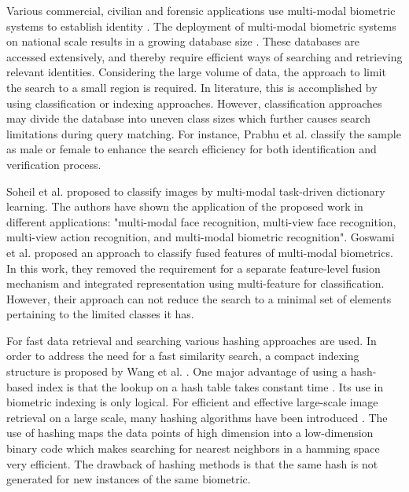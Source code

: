 Various commercial, civilian and forensic applications use multi-modal biometric systems to establish identity \cite{Haghighat2016multi}. 
The deployment of multi-modal biometric systems on national scale results in a growing database
size \cite{Gyaourova2012multi}. 
These databases are accessed extensively, and thereby require efficient ways of
searching and retrieving relevant identities. 
Considering the large volume of data,
the approach to limit the search to a small region is required. In literature, this is
accomplished by using classification or indexing approaches.
However, classification approaches may
divide the database into uneven class sizes which further causes search limitations
during query matching. For instance, Prabhu et al. \cite{Prabhu2015multi} classify the sample as male or
female to enhance the search efficiency for both identification and verification process.

Soheil et al. \cite{Bahrampour2016multi} proposed to classify images by multi-modal task-driven dictionary
learning. The authors have shown the application of the proposed work in different
applications: "multi-modal face recognition, multi-view face recognition, multi-view
action recognition, and multi-modal biometric recognition". 
Goswami et al. \cite{Goswami2016multi}
proposed an approach to classify fused features of multi-modal biometrics. In this
work, they removed the requirement for a separate feature-level fusion mechanism
and integrated representation using multi-feature for classification. However,
their approach can not reduce the search to a minimal set of elements pertaining to the
limited classes it has.

For fast data retrieval and searching various hashing approaches are used.
In order to address the need for a fast similarity search, a compact indexing structure is proposed by Wang et al.
\cite{Wang2012multi}. One major advantage of using a hash-based index is that the lookup on a hash table takes constant time \cite{Wang2016multi}. 
Its use in biometric indexing is only logical. For efficient and effective
large-scale image retrieval on a large scale, many hashing algorithms have been introduced \cite{Kaushik2013multi}. 
The use of hashing maps the data points of high dimension into 
a low-dimension binary code which makes searching for nearest neighbors in a hamming space very efficient.\cite{Wang2016multi}
The drawback of hashing methods is that the same hash is not generated for new instances of the same biometric.

